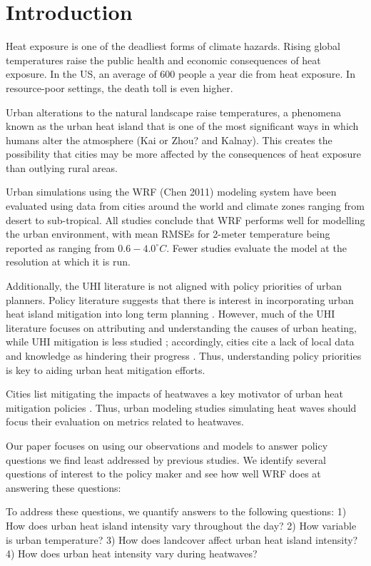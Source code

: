 \documentclass[draft,linenumbers]{agujournal}
\begin{document}
\section{Introduction}\label{sec:intro}
Heat exposure is one of the deadliest forms of climate hazards. Rising global temperatures raise the public health and economic consequences of heat exposure. In the US, an average of 600 people a year die from heat exposure. In resource-poor settings, the death toll is even higher. 

Urban alterations to the natural landscape raise temperatures, a phenomena known as the urban heat island that is one of the most significant ways in which humans alter the atmosphere (Kai or Zhou? and Kalnay). This creates the possibility that cities may be more affected by the consequences of heat exposure than outlying rural areas. 

Urban simulations using the WRF (Chen 2011) modeling system have been evaluated using data from cities around the world and climate zones ranging from desert to sub-tropical. All studies conclude that WRF performs well for modelling the urban environment, with mean RMSEs for 2-meter temperature being reported as ranging from $0.6-4.0^\circ C$. Fewer studies evaluate the model at the resolution at which it is run. 

Additionally, the UHI literature is not aligned with policy priorities of urban planners. Policy literature suggests that there is interest in incorporating urban heat island mitigation into long term planning \cite{shickman2016current}. However, much of the UHI literature focuses on attributing and understanding the causes of urban heating, while UHI mitigation is less studied \cite{huang2018urban}; accordingly, cities cite a lack of local data and knowledge as hindering their progress \cite{hewitt2014cool}. Thus, understanding policy priorities is key to aiding urban heat mitigation efforts. 

Cities list mitigating the impacts of heatwaves a key motivator of urban heat mitigation policies \citep{hewitt2014cool}. Thus, urban modeling studies simulating heat waves should focus their evaluation on metrics related to heatwaves. 

Our paper focuses on using our observations and models to answer policy questions we find least addressed by previous studies. We identify several questions of interest to the policy maker and see how well WRF does at answering these questions: 

To address these questions, we quantify answers to the following questions: 
1) How does urban heat island intensity vary throughout the day? 
2) How variable is urban temperature? 
3) How does landcover affect urban heat island intensity? 
4) How does urban heat intensity vary during heatwaves? 
\end{document}
